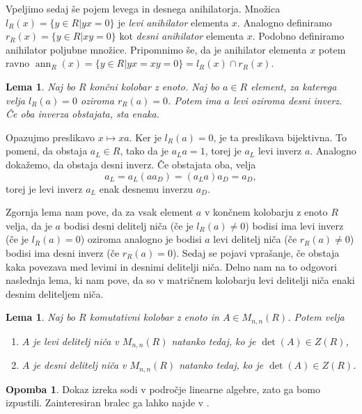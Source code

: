 \documentclass[a4paper, 12pt]{amsart}
\theoremstyle{definition} %
\newtheorem{opomba}[definicija]{Opomba}
\theoremstyle{plain} %
\newtheorem{lema}[definicija]{Lema}
\DeclareMathOperator{\ann}{ann}
\DeclareMathOperator{\deter}{det}
\begin{document}
Vpeljimo sedaj še pojem levega in desnega anihilatorja. Množica $l_R(x)=\{y\in R| yx =0\}$ je \emph{levi anihilator} elementa $x$. Analogno definiramo $r_R(x) = \{ y\in R|xy = 0\}$ kot \emph{desni anihilator} elementa $x$. Podobno definiramo anihilator poljubne množice. Pripomnimo še, da je anihilator elementa $x$ potem ravno $\ann_R(x) = \{y\in R|yx=xy=0\} = l_R(x) \cap r_R(x)$.

\begin{lema}
\label{inverz}
Naj bo $R$ končni kolobar z enoto. Naj bo $a\in R$ element, za katerega velja $l_R(a) = 0 $ oziroma $r_R(a)=0$. Potem ima $a$ levi oziroma desni inverz. Če oba inverza obstajata, sta enaka. 
\end{lema}

\proof
Opazujmo preslikavo $x \mapsto xa$. Ker je $l_R(a) = 0$, je ta preslikava bijektivna. To pomeni, da obstaja $a_L\in R$, tako da je $a_L a = 1$, torej je $a_L$ levi inverz $a$. Analogno dokažemo, da obstaja desni inverz. Če obstajata oba, velja
$$
a_L = a_L(aa_D) = (a_L a)a_D = a_D,
$$
torej je levi inverz $a_L$ enak desnemu inverzu $a_D$.
\endproof

Zgornja lema nam pove, da za vsak element $a$ v končnem kolobarju z enoto $R$ velja, da je $a$ bodisi desni delitelj niča (če je $l_R(a)\neq 0$) bodisi ima levi inverz (če je $l_R(a)=0$) oziroma analogno je bodisi $a$ levi delitelj niča (če $r_R(a) \neq 0$) bodisi ima desni inverz (če $r_R(a) = 0$). Sedaj se pojavi vprašanje, če obstaja kaka povezava med levimi in desnimi delitelji niča. Delno nam na to odgovori naslednja lema, ki nam pove, da so v matričnem kolobarju levi delitelji niča enaki desnim deliteljem niča.

\begin{lema}
\label{enostranskiDelitelji0Matricni}
Naj bo $R$ komutativni kolobar z enoto in $A\in M_{n,n}(R)$. Potem velja
\begin{enumerate}
\item $A$ je levi delitelj niča v $M_{n,n}(R)$ natanko tedaj, ko je $\deter(A)\in Z(R)$,
\item $A$ je desni delitelj niča v $M_{n,n}(R)$ natanko tedaj, ko je $\deter(A)\in Z(R)$.
\end{enumerate}
\end{lema}

\begin{opomba}
Dokaz izreka sodi v področje linearne algebre, zato ga bomo izpustili. Zainteresiran bralec  ga lahko najde v \cite[Izrek 9.1]{Brown}.
\end{opomba}
\end{document}
